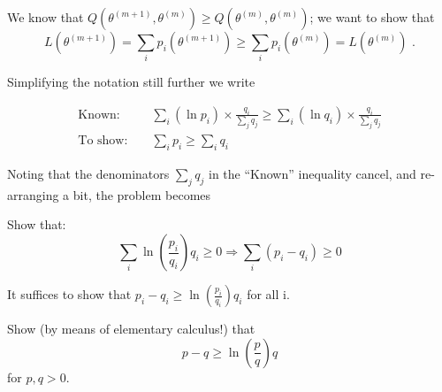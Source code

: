We know that $Q(\theta^{(m+1)},\theta^{(m)}) \geq
Q(\theta^{(m)},\theta^{(m)})$; we want to show that
\[
L(\theta^{(m+1)}) = \sum_i p_i(\theta^{(m+1)})
               \geq \sum_i p_i(\theta^{(m)})
                  = L(\theta^{(m)})\mbox{ .}
\]

Simplifying the notation still further we write

\begin{eqnarray*}
\mbox{Known: } & & \sum_i (\ln p_i) \times \frac{q_i}{\sum_j q_j} \geq
\sum_i (\ln q_i) \times \frac{q_i}{\sum_j q_j} \\
\mbox{To show: } & & \sum_i p_i \geq \sum_i q_i
\end{eqnarray*}

Noting that the denominators $\sum_j q_j$ in the ``Known'' inequality
cancel, and re-arranging a bit, the problem becomes

Show that:
\[
\sum_i \ln(\frac{p_i}{q_i}) q_i \geq 0 \Longrightarrow
\sum_i (p_i - q_i) \geq 0
\]

It suffices to show that $p_i - q_i \geq \ln(\frac{p_i}{q_i}) q_i$ for all i.

 Show (by means of elementary calculus!) that
\[
p - q \geq \ln(\frac{p}{q})q
\]
for $p, q > 0$.



